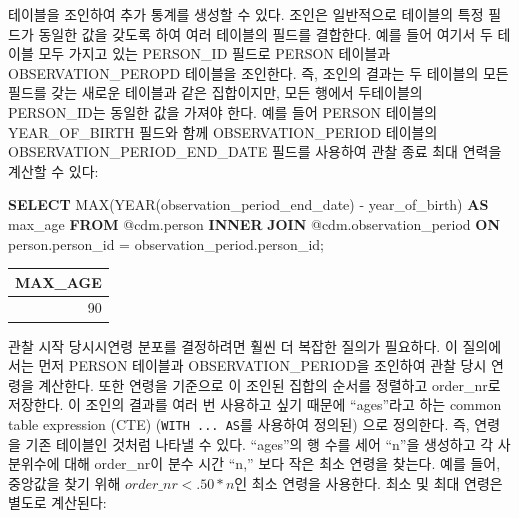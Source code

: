 \documentclass[11pt]{book}
\newenvironment{Shaded}{\begin{snugshade}}{\end{snugshade}}
\newcommand{\KeywordTok}[1]{\textcolor[rgb]{0.13,0.29,0.53}{\textbf{#1}}}
\newcommand{\DataTypeTok}[1]{\textcolor[rgb]{0.13,0.29,0.53}{#1}}
\newcommand{\FunctionTok}[1]{\textcolor[rgb]{0.00,0.00,0.00}{#1}}
\newcommand{\NormalTok}[1]{#1}
\theoremstyle{definition}
\theoremstyle{definition}
\theoremstyle{definition}
\theoremstyle{remark}
\begin{document}
테이블을 조인하여 추가 통계를 생성할 수 있다. 조인은 일반적으로 테이블의
특정 필드가 동일한 값을 갖도록 하여 여러 테이블의 필드를 결합한다. 예를
들어 여기서 두 테이블 모두 가지고 있는 PERSON\_ID 필드로 PERSON 테이블과
OBSERVATION\_PEROPD 테이블을 조인한다. 즉, 조인의 결과는 두 테이블의
모든 필드를 갖는 새로운 테이블과 같은 집합이지만, 모든 행에서 두테이블의
PERSON\_ID는 동일한 값을 가져야 한다. 예를 들어 PERSON 테이블의
YEAR\_OF\_BIRTH 필드와 함께 OBSERVATION\_PERIOD 테이블의
OBSERVATION\_PERIOD\_END\_DATE 필드를 사용하여 관찰 종료 최대 연력을
계산할 수 있다:

\begin{Shaded}
\begin{Highlighting}[]
\KeywordTok{SELECT} \FunctionTok{MAX}\NormalTok{(}\DataTypeTok{YEAR}\NormalTok{(observation_period_end_date) -}
\NormalTok{           year_of_birth) }\KeywordTok{AS}\NormalTok{ max_age}
\KeywordTok{FROM}\NormalTok{ @cdm.person}
\KeywordTok{INNER} \KeywordTok{JOIN}\NormalTok{ @cdm.observation_period}
  \KeywordTok{ON}\NormalTok{ person.person_id = observation_period.person_id;}
\end{Highlighting}
\end{Shaded}

\begin{longtable}[]{@{}r@{}}
\toprule
MAX\_AGE\tabularnewline
\midrule
\endhead
90\tabularnewline
\bottomrule
\end{longtable}

관찰 시작 당시시연령 분포를 결정하려면 훨씬 더 복잡한 질의가 필요하다.
이 질의에서는 먼저 PERSON 테이블과 OBSERVATION\_PERIOD을 조인하여 관찰
당시 연령을 계산한다. 또한 연령을 기준으로 이 조인된 집합의 순서를
정렬하고 order\_nr로 저장한다. 이 조인의 결과를 여러 번 사용하고 싶기
때문에 ``ages''라고 하는 common table expression (CTE)
(\texttt{WITH\ ...\ AS}를 사용하여 정의된) 으로 정의한다. 즉, 연령을
기존 테이블인 것처럼 나타낼 수 있다. ``ages''의 행 수를 세어 ``n''을
생성하고 각 사분위수에 대해 order\_nr이 분수 시간 ``n,'' 보다 작은 최소
연령을 찾는다. 예를 들어, 중앙값을 찾기 위해 \(order\_nr < .50 * n\)인
최소 연령을 사용한다. 최소 및 최대 연령은 별도로 계산된다:
\end{document}
